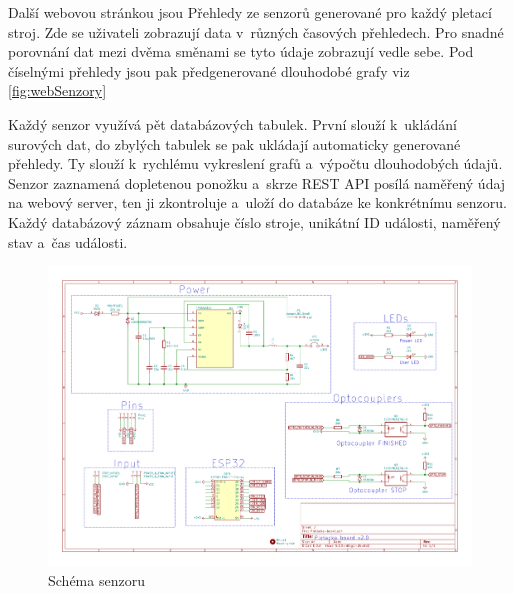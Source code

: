 \documentclass[12pt, a4paper]{article}
\begin{document}
Další webovou stránkou jsou Přehledy ze senzorů generované pro každý pletací stroj.
Zde se uživateli zobrazují data v~různých časových přehledech.
Pro snadné porovnání dat mezi dvěma směnami se tyto údaje zobrazují vedle sebe.
Pod číselnými přehledy jsou pak předgenerované dlouhodobé grafy viz \ref{fig:webSenzory}

Každý senzor využívá pět databázových tabulek. První slouží k~ukládání surových dat, do zbylých tabulek se pak ukládají automaticky generované přehledy.
Ty slouží k~rychlému vykreslení grafů a~výpočtu dlouhodobých údajů.
Senzor zaznamená dopletenou ponožku a~skrze REST API posílá naměřený údaj na webový server, ten ji zkontroluje a~uloží do databáze ke konkrétnímu senzoru.
Každý databázový záznam obsahuje číslo stroje, unikátní ID události, naměřený stav a~čas události.

% 
\begin{figure}[htbp]
    \centering
    \includegraphics[width=\textwidth]{DATASHEET/Pletacka_board_v2.pdf}
    \caption{Schéma senzoru}
    \label{fig:Schemav1}
\end{figure}
\end{document}
